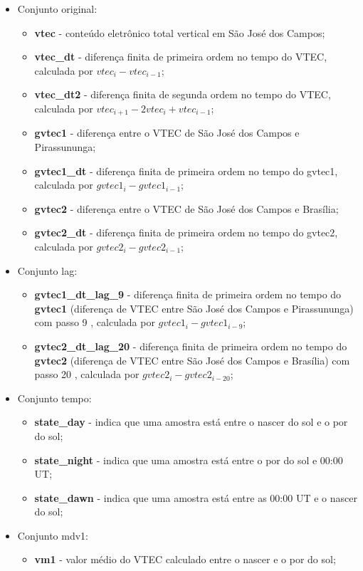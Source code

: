 \begin{itemize}
\item Conjunto original:
\begin{itemize}
\item {\bf vtec} - conteúdo eletrônico total vertical em São José dos Campos;
\item {\bf vtec\_dt} - diferença finita de primeira ordem no tempo do VTEC, calculada por $vtec_i-vtec_{i-1}$;
\item {\bf vtec\_dt2} - diferença finita de segunda ordem no tempo do VTEC, calculada por $vtec_{i+1}-2vtec_i+vtec_{i-1}$;
\item {\bf gvtec1} - diferença entre o VTEC de São José dos Campos e Pirassununga;
\item {\bf gvtec1\_dt} - diferença finita de primeira ordem no tempo do gvtec1, calculada por $gvtec1_i-gvtec1_{i-1}$;
\item {\bf gvtec2} - diferença entre o VTEC de São José dos Campos e Brasília;
\item {\bf gvtec2\_dt} - diferença finita de primeira ordem no tempo do gvtec2, calculada por $gvtec2_i-gvtec2_{i-1}$;
\end{itemize}
\item Conjunto lag:
\begin{itemize}
\item {\bf gvtec1\_dt\_lag\_9} - diferença finita de primeira ordem no tempo do {\bf gvtec1} (diferença de VTEC entre São José dos Campos e Pirassununga) com passo 9 , calculada por $gvtec1_i-gvtec1_{i-9}$;
\item {\bf gvtec2\_dt\_lag\_20} - diferença finita de primeira ordem no tempo do {\bf gvtec2} (diferença de VTEC entre São José dos Campos e Brasília) com passo 20 , calculada por $gvtec2_i-gvtec2_{i-20}$;
\end{itemize}
\item Conjunto tempo:
\begin{itemize}
\item {\bf state\_day} - indica que uma amostra está entre o nascer do sol e o por do sol;
\item {\bf state\_night} - indica que uma amostra está entre o por do sol e 00:00 UT;
\item {\bf state\_dawn} - indica que uma amostra está entre as 00:00 UT e o nascer do sol;
\end{itemize}
\item Conjunto mdv1:
\begin{itemize}
\item {\bf vm1} - valor médio do VTEC calculado entre o nascer e o por do sol;

\end{itemize}
\end{itemize}
